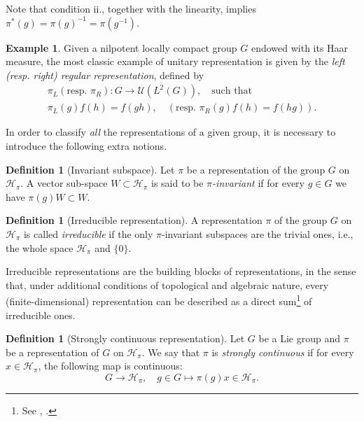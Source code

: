 \documentclass[12pt,oneside,a4paper]{book}
\numberwithin{equation}{section}     %
\theoremstyle{plain}
\theoremstyle{definition}
\newtheorem{definition}[theorem]{Definition}
\newtheorem{example}[theorem]{Example}
\begin{document}
Note that condition ii., together with the linearity, implies $\pi^*(g)=\pi(g)^{-1}=\pi(g^{-1})$. 
\begin{example}
	Given a nilpotent locally compact group $G$ endowed with its Haar measure, the most classic example of unitary representation is given by the \textit{left (resp. right) regular representation}, defined by
	\begin{align*}
	\pi_L(\text{resp. }\pi_R): G\rightarrow \mathcal U (L^2(G)), \quad\text{such that} \\
	\pi_L(g)f(h)=f(gh),\quad(\text{resp. }\pi_R(g)f(h)=f(hg)).
	\end{align*} 
\end{example}

In order to classify \textit{all} the representations of a given group, it is necessary to introduce the following extra notions.
\begin{definition}[Invariant subspace]
	Let $\pi$ be a representation of the group $G$ on $\mathcal{H}_\pi$. A vector sub-space $W\subset \mathcal{H}_\pi$ is said to be \textit{$\pi$-invariant} if for every $g\in G$ we have $\pi(g)W\subset W$.
\end{definition}

\begin{definition}[Irreducible representation]
	A representation $\pi$ of the group $G$ on $\mathcal{H}_\pi$ is called \textit{irreducible} if the only $\pi$-invariant subspaces are the trivial ones, i.e., the whole space $\mathcal H_\pi$ and $\{0\}$.
\end{definition}

Irreducible representations are the building blocks of representations, in the sense that, under additional conditions of topological and algebraic nature, every (finite-dimensional) representation can be described as a direct sum\footnote{See \cite[Definition 6.3.14]{RT2009}, \cite[Definition 7.2.7, Proposition 7.2.8]{RT2009}.} of irreducible ones.

\begin{definition}[Strongly continuous representation]
	Let $G$ be a Lie group and $\pi$ be a representation of $G$ on $\mathcal H_\pi$. We say that $\pi$ is \textit{strongly continuous} if for every $x\in\mathcal{H}_\pi$, the following map is continuous:
	\[
	G\rightarrow \mathcal{H}_\pi,\quad g \in G\mapsto \pi(g)x\in \mathcal{H}_\pi.
	\]
\end{definition}
\end{document}
